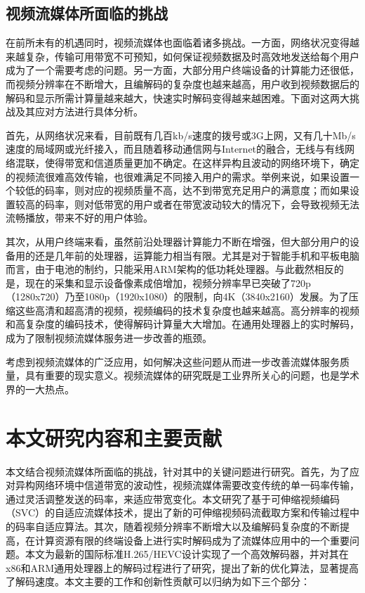 \subsection{视频流媒体所面临的挑战}

在前所未有的机遇同时，视频流媒体也面临着诸多挑战。一方面，网络状况变得越来越复杂，传输可用带宽不可预知，如何保证视频数据及时高效地发送给每个用户成为了一个需要考虑的问题。另一方面，大部分用户终端设备的计算能力还很低，而视频分辨率在不断增大，且编解码的复杂度也越来越高，用户收到视频数据后的解码和显示所需计算量越来越大，快速实时解码变得越来越困难。下面对这两大挑战及其应对方法进行具体分析。

首先，从网络状况来看，目前既有几百kb/s速度的拨号或3G上网，又有几十Mb/s速度的局域网或光纤接入，而且随着移动通信网与Internet的融合，无线与有线网络混联，使得带宽和信道质量更加不确定。在这样异构且波动的网络环境下，确定的视频流很难高效传输，也很难满足不同接入用户的需求。举例来说，如果设置一个较低的码率，则对应的视频质量不高，达不到带宽充足用户的满意度；而如果设置较高的码率，则对低带宽的用户或者在带宽波动较大的情况下，会导致视频无法流畅播放，带来不好的用户体验。

其次，从用户终端来看，虽然前沿处理器计算能力不断在增强，但大部分用户的设备用的还是几年前的处理器，运算能力相当有限。尤其是对于智能手机和平板电脑而言，由于电池的制约，只能采用ARM架构的低功耗处理器。与此截然相反的是，现在的采集和显示设备像素成倍增加，视频分辨率早已突破了720p（1280x720）乃至1080p（1920x1080）的限制，向4K（3840x2160）发展。为了压缩这些高清和超高清的视频，视频编码的技术复杂度也越来越高。高分辨率的视频和高复杂度的编码技术，使得解码计算量大大增加。在通用处理器上的实时解码，成为了限制视频流媒体服务进一步改善的瓶颈。

考虑到视频流媒体的广泛应用，如何解决这些问题从而进一步改善流媒体服务质量，具有重要的现实意义。视频流媒体的研究既是工业界所关心的问题，也是学术界的一大热点。

\section{本文研究内容和主要贡献}

本文结合视频流媒体所面临的挑战，针对其中的关键问题进行研究。首先，为了应对异构网络环境中信道带宽的波动性，视频流媒体需要改变传统的单一码率传输，通过灵活调整发送的码率，来适应带宽变化。本文研究了基于可伸缩视频编码（SVC）的自适应流媒体技术，提出了新的可伸缩视频码流截取方案和传输过程中的码率自适应算法。其次，随着视频分辨率不断增大以及编解码复杂度的不断提高，在计算资源有限的终端设备上进行实时解码成为了流媒体应用中的一个重要问题。本文为最新的国际标准H.265/HEVC设计实现了一个高效解码器，并对其在x86和ARM通用处理器上的解码过程进行了研究，提出了新的优化算法，显著提高了解码速度。本文主要的工作和创新性贡献可以归纳为如下三个部分：

